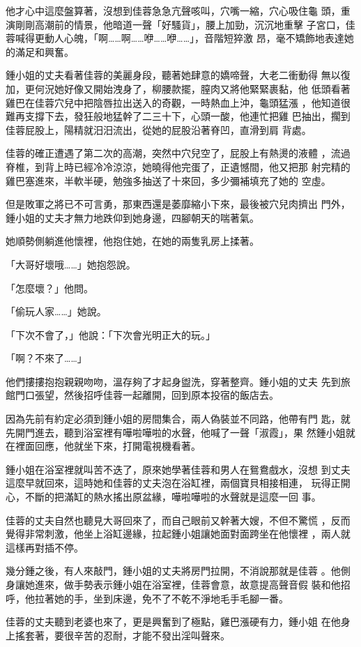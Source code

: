 他才心中這麼盤算著，沒想到佳蓉急急亢聲咳叫，穴嘴一縮，穴心吸住龜
頭，重演剛剛高潮前的情景，他暗道一聲「好騷貨」，腰上加勁，沉沉地重擊
子宮口，佳蓉喊得更動人心魄，「啊……啊……咿……咿……」，音階短猝激
昂，毫不矯飾地表達她的滿足和興奮。

鍾小姐的丈夫看著佳蓉的美麗身段，聽著她肆意的嬌啼聲，大老二衝動得
無以復加，更何況她好像又開始洩身了，柳腰款擺，膣肉又將他緊緊裹黏，他
低頭看著雞巴在佳蓉穴兒中把陰唇拉出送入的奇觀，一時熱血上沖，龜頭猛漲
，他知道很難再支撐下去，發狂般地猛幹了二三十下，心頭一酸，他連忙把雞
巴抽出，擱到佳蓉屁股上，陽精就汨汨流出，從她的屁股沿著脊凹，直滑到肩
背處。

佳蓉的確正遭遇了第二次的高潮，突然中穴兒空了，屁股上有熱燙的液體
，流過脊椎，到背上時已經冷冷涼涼，她曉得他完蛋了，正遺憾間，他又把那
射完精的雞巴塞進來，半軟半硬，勉強多抽送了十來回，多少彌補填充了她的
空虛。

但是敗軍之將已不可言勇，那東西還是萎靡縮小下來，最後被穴兒肉擠出
門外，鍾小姐的丈夫才無力地跌仰到她身邊，四腳朝天的喘著氣。

她順勢側躺進他懷裡，他抱住她，在她的兩隻乳房上揉著。

「大哥好壞哦……」她抱怨說。

「怎麼壞？」他問。

「偷玩人家……」她說。

「下次不會了，」他說：「下次會光明正大的玩。」

「啊？不來了……」

他們摟摟抱抱親親吻吻，溫存夠了才起身盥洗，穿著整齊。鍾小姐的丈夫
先到旅館門口張望，然後招呼佳蓉一起離開，回到原本投宿的飯店去。

因為先前有約定必須到鍾小姐的房間集合，兩人偽裝並不同路，他帶有門
匙，就先開門進去，聽到浴室裡有嘩啦嘩啦的水聲，他喊了一聲「淑霞」，果
然鍾小姐就在裡面回應，他就坐下來，打開電視機看著。

鍾小姐在浴室裡就叫苦不迭了，原來她學著佳蓉和男人在鴛鴦戲水，沒想
到丈夫這麼早就回來，這時她和佳蓉的丈夫泡在浴缸裡，兩個寶貝相接相連，
玩得正開心，不斷的把滿缸的熱水搖出原盆緣，嘩啦嘩啦的水聲就是這麼一回
事。

佳蓉的丈夫自然也聽見大哥回來了，而自己眼前又幹著大嫂，不但不驚慌
，反而覺得非常刺激，他坐上浴缸邊緣，拉起鍾小姐讓她面對面跨坐在他懷裡
，兩人就這樣再對插不停。

幾分鍾之後，有人來敲門，鍾小姐的丈夫將房門拉開，不消說那就是佳蓉
。他側身讓她進來，做手勢表示鍾小姐在浴室裡，佳蓉會意，故意提高聲音假
裝和他招呼，他拉著她的手，坐到床邊，免不了不乾不淨地毛手毛腳一番。

佳蓉的丈夫聽到老婆也來了，更是興奮到了極點，雞巴漲硬有力，鍾小姐
在他身上搖套著，要很辛苦的忍耐，才能不發出淫叫聲來。

